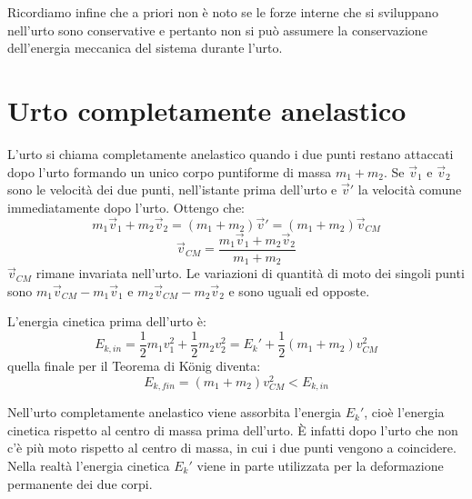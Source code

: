 \documentclass[class=book, crop=false, oneside, 12pt]{standalone}
\begin{document}
Ricordiamo infine che a priori non è noto se le forze interne che si sviluppano nell'urto sono conservative e pertanto non si può assumere la conservazione dell'energia meccanica del sistema durante l'urto.

\section{Urto completamente anelastico}

L'urto si chiama completamente anelastico quando i due punti restano attaccati dopo l'urto formando un unico corpo puntiforme di massa \(m_1 + m_2\).
Se \(\overrightarrow{v}_1\) e \(\overrightarrow{v}_2\) sono le velocità dei due punti, nell'istante prima dell'urto e \(\overrightarrow{v}'\) la velocità comune immediatamente dopo l'urto.
Ottengo che:
\begin{equation*}
    m_1 \overrightarrow{v}_1 + m_2 \overrightarrow{v}_2 = \left( m_1 + m_2 \right) \overrightarrow{v}' = \left( m_1 + m_2 \right) \overrightarrow{v}_{CM}
\end{equation*} 
\begin{equation*}
    \overrightarrow{v}_{CM} = \frac{m_1 \overrightarrow{v}_1 + m_2 \overrightarrow{v}_2}{m_1 + m_2}
\end{equation*}
\(\overrightarrow{v}_{CM}\) rimane invariata nell'urto. Le variazioni di quantità di moto dei singoli punti sono \(m_1 \overrightarrow{v}_{CM} - m_1 \overrightarrow{v}_{1}\) e \(m_2 \overrightarrow{v}_{CM} - m_2 \overrightarrow{v}_{2}\) e sono uguali ed opposte.

L'energia cinetica prima dell'urto è:
\begin{equation*}
    E_{k,in} = \frac{1}{2} m_1 v_1^2 + \frac{1}{2} m_2 v_2^2 = E_k' + \frac{1}{2} \left( m_1 + m_2 \right) v_{CM}^2
\end{equation*}
quella finale per il Teorema di König diventa: %
\begin{equation*}
    E_{k,fin} = \left( m_1 + m_2 \right) v_{CM}^2 < E_{k,in}
\end{equation*}

Nell'urto completamente anelastico viene assorbita l'energia \(E_k'\), cioè l'energia cinetica rispetto al centro di massa prima dell'urto. 
È infatti dopo l'urto che non c'è più moto rispetto al centro di massa, in cui i due punti vengono a coincidere. 
Nella realtà l'energia cinetica \(E_k'\) viene in parte utilizzata per la deformazione permanente dei due corpi. 
\end{document}
